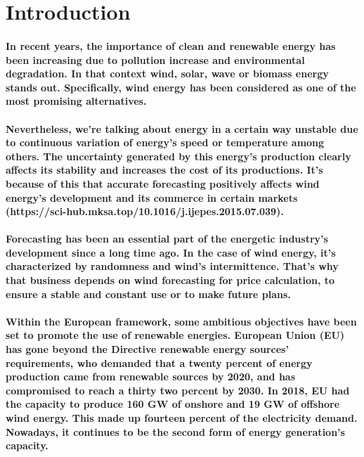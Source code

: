 \section{Introduction}

\paragraph{In recent years, the importance of clean and renewable energy has been increasing due to pollution increase and environmental degradation. In that context wind, solar, wave or biomass energy stands out. Specifically, wind energy has been considered as one of the most promising alternatives.
 }
\paragraph{Nevertheless, we’re talking about energy in a certain way unstable due to continuous variation of energy’s speed or  temperature among others. The uncertainty generated by this energy’s production clearly affects its stability and increases the cost of its productions. It’s because of this that accurate forecasting  positively affects wind energy’s development and its commerce in certain markets (https://sci-hub.mksa.top/10.1016/j.ijepes.2015.07.039).}

\paragraph{Forecasting has been an essential part of the energetic industry’s development since a long time ago. In the case of wind energy, it’s characterized by randomness and wind’s intermittence. That’s why that business depends on wind forecasting for price calculation, to ensure a stable and constant use or to make future plans.}

\paragraph{Within the European framework, some ambitious objectives have been set to promote the use of renewable energies. European Union (EU) has gone beyond the Directive renewable energy sources’ requirements, who demanded that a twenty percent of energy production came from renewable sources by 2020, and has compromised to reach a thirty two percent by 2030. In 2018, EU had the capacity to produce 160 GW of onshore and 19 GW of offshore wind energy. This made up fourteen percent of the electricity demand. Nowadays, it continues to be the second form of energy generation’s capacity.}

